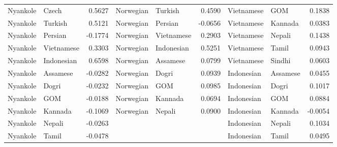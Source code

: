 \documentclass[11pt]{article} %
\begin{document}
\begin{table}
\begin{tabular}{llr@{\hspace{12pt}}llr@{\hspace{12pt}}llr}
            Nyankole                     & Czech               & 0.5627        & Norwegian           & Turkish             & 0.4590        & Vietnamese          & GOM                 & 0.1838        \\
            Nyankole                     & Turkish             & 0.5121        & Norwegian           & Persian             & -0.0656       & Vietnamese          & Kannada             & 0.0383        \\
            Nyankole                     & Persian             & -0.1774       & Norwegian           & Vietnamese          & 0.2903        & Vietnamese          & Nepali              & 0.1438        \\
            Nyankole                     & Vietnamese          & 0.3303        & Norwegian           & Indonesian          & 0.5251        & Vietnamese          & Tamil               & 0.0943        \\
            Nyankole                     & Indonesian          & 0.6598        & Norwegian           & Assamese            & 0.0799        & Vietnamese          & Sindhi              & 0.0603        \\
            Nyankole                     & Assamese            & -0.0282       & Norwegian           & Dogri               & 0.0939        & Indonesian          & Assamese            & 0.0455        \\
            Nyankole                     & Dogri               & -0.0232       & Norwegian           & GOM                 & 0.0985        & Indonesian          & Dogri               & 0.1017        \\
            Nyankole                     & GOM                 & -0.0188       & Norwegian           & Kannada             & 0.0694        & Indonesian          & GOM                 & 0.0884        \\
            Nyankole                     & Kannada             & -0.1069       & Norwegian           & Nepali              & 0.0900        & Indonesian          & Kannada             & -0.0054       \\
            Nyankole                     & Nepali              & -0.0263       &                     &                     &               & Indonesian          & Nepali              & 0.1034        \\
            Nyankole                     & Tamil               & -0.0478       &                     &                     &               & Indonesian          & Tamil               & 0.0495        \\

\end{tabular}
\end{table}
\end{document}
